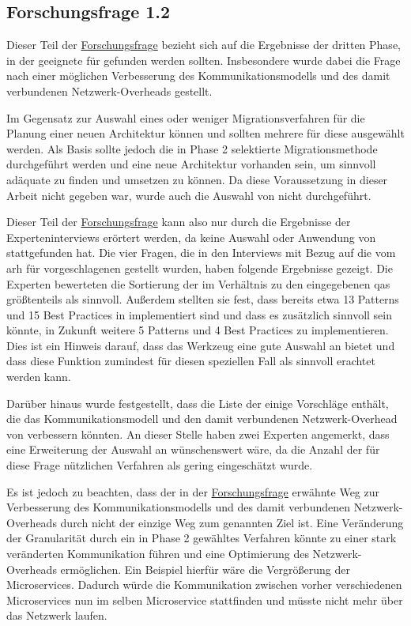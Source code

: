\subsection{Forschungsfrage 1.2}

Dieser Teil der \hyperref[forschungsfrage:1]{Forschungsfrage} bezieht sich auf die Ergebnisse der dritten Phase, in der geeignete \bpp für \jf gefunden werden sollten.
Insbesondere wurde dabei die Frage nach einer möglichen Verbesserung des Kommunikationsmodells und des damit verbundenen Netzwerk-Overheads gestellt.

Im Gegensatz zur Auswahl eines oder weniger Migrationsverfahren für die Planung einer neuen Architektur können und sollten mehrere \bpp für diese ausgewählt werden.
Als Basis sollte jedoch die in Phase 2 selektierte Migrationsmethode durchgeführt werden und eine neue Architektur vorhanden sein, um sinnvoll adäquate \bpp zu finden und umsetzen zu können.
Da diese Voraussetzung in dieser Arbeit nicht gegeben war, wurde auch die Auswahl von \bpp nicht durchgeführt.

Dieser Teil der  \hyperref[forschungsfrage:1]{Forschungsfrage} kann also nur durch die Ergebnisse der Experteninterviews erörtert werden, da keine Auswahl oder Anwendung von \bpp stattgefunden hat.
Die vier Fragen, die in den Interviews mit Bezug auf die vom \gls{arh} für \jf vorgeschlagenen \bpp gestellt wurden, haben folgende Ergebnisse gezeigt.
Die Experten bewerteten die Sortierung der \bpp im Verhältnis zu den eingegebenen \glspl{qa} größtenteils als sinnvoll. 
Außerdem stellten sie fest, dass bereits etwa 13 Patterns und 15 Best Practices in \jf implementiert sind und dass es zusätzlich sinnvoll sein könnte, in Zukunft weitere 5 Patterns und 4 Best Practices zu implementieren.
Dies ist ein Hinweis darauf, dass das Werkzeug eine gute Auswahl an \bpp bietet und dass diese Funktion zumindest für diesen speziellen Fall als sinnvoll erachtet werden kann.

Darüber hinaus wurde festgestellt, dass die Liste der \bpp einige Vorschläge enthält, die das Kommunikationsmodell und den damit verbundenen Netzwerk-Overhead von \jf verbessern könnten. 
An dieser Stelle haben zwei Experten angemerkt, dass eine Erweiterung der Auswahl an \bpp wünschenswert wäre, da die Anzahl der für diese Frage nützlichen Verfahren als gering eingeschätzt wurde.

Es ist jedoch zu beachten, dass der in der \hyperref[forschungsfrage:1]{Forschungsfrage} erwähnte Weg zur Verbesserung des Kommunikationsmodells und des damit verbundenen Netzwerk-Overheads durch \bpp nicht der einzige Weg zum genannten Ziel ist.
Eine Veränderung der Granularität durch ein in Phase 2 gewähltes Verfahren könnte zu einer stark veränderten Kommunikation führen und eine Optimierung des Netzwerk-Overheads ermöglichen.
Ein Beispiel hierfür wäre die Vergrößerung der Microservices. 
Dadurch würde die Kommunikation zwischen vorher verschiedenen Microservices nun im selben Microservice stattfinden und müsste nicht mehr über das Netzwerk laufen.

